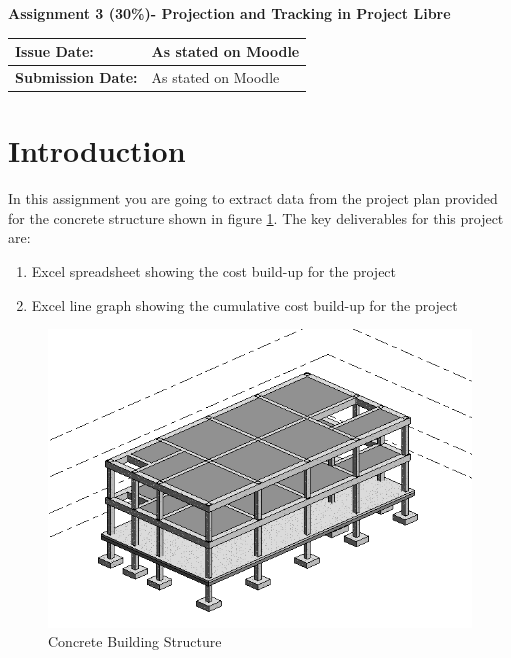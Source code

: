 


\begin{flushleft}
\Large\textbf{Assignment 3 (30\%)- Projection and Tracking in Project Libre}\\
\end{flushleft}



\begin{tabularx}{\textwidth}{ |X|X| }
	\hline
	\textbf{Issue Date:} & As stated on Moodle \\
	\hline 
	\textbf{Submission Date:}  & As stated on Moodle  \\
	\hline
\end{tabularx}

\section*{Introduction}

In this assignment you are going to extract data from the project plan provided for the concrete structure shown in figure \ref{fig:building}.  The key deliverables for this project are:

\begin{enumerate}
	\item Excel spreadsheet showing the cost build-up for the project 
	\item Excel line graph showing the cumulative cost build-up for the project 
\end{enumerate}


\begin{figure}[b]
	\centering
	\includegraphics[width=1.0\linewidth]{./img/Building}
	\caption{Concrete Building Structure}
	\label{fig:building}
\end{figure}





